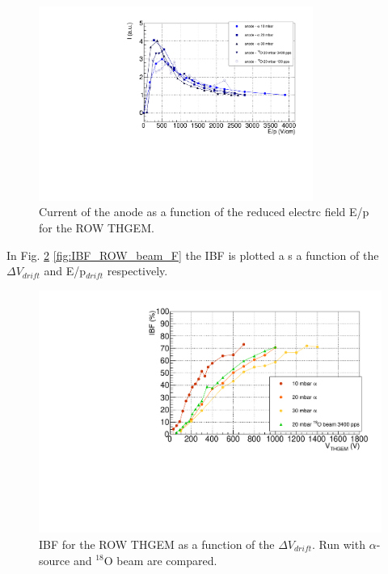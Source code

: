 \documentclass[a4paper, 11 pt]{report}
\newcommand{\Vdrift}{$ \Delta V_{drift}$}
\newcommand{\Edrift}{E/p$_{drift}$}
\begin{document}
  \begin{figure}[htbp]
	\centering
	\includegraphics[width=0.8\textwidth]{Immagini/driftScan_ROW_THGEM_comp_F.pdf}
	\caption{Current of the anode as a function of the reduced electrc field E/p for the 
	ROW THGEM.}
	\label{fig:driftScan_withbeam_F}
  \end{figure}
  In Fig. \ref{fig:IBF_ROW_beam} \ref{fig:IBF_ROW_beam_F} the IBF is plotted a s a function of the
  \Vdrift{} and \Edrift{} respectively.  
  \begin{figure}[htbp]
	\centering
	\includegraphics[width=\textwidth]{Immagini/IBF_ROW_Comparison_1.pdf}
	\caption{IBF for the ROW THGEM as a function of the \Vdrift. Run with 
	$\alpha$-source	and $^{18}$O beam are compared.}
	\label{fig:IBF_ROW_beam}
  \end{figure}
\end{document}
